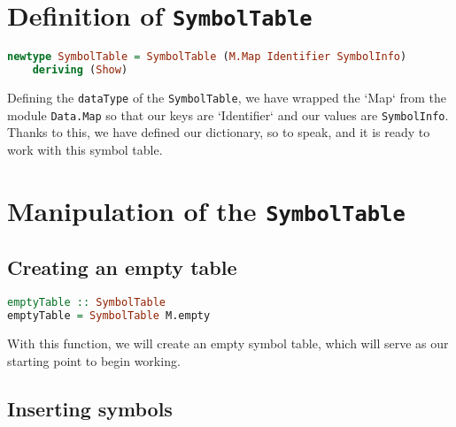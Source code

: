 \documentclass{article}
\newcommand{\code}[1]{\colorbox{codebackground}{\texttt{#1}}}
\begin{document}
\section{Definition of \code{SymbolTable}}

\begin{lstlisting}[language=Haskell]
newtype SymbolTable = SymbolTable (M.Map Identifier SymbolInfo)
    deriving (Show)
\end{lstlisting}

Defining the \code{dataType} of the \code{SymbolTable}, we have wrapped the `Map` from the module \code{Data.Map} so that our keys are `Identifier` and our values are \code{SymbolInfo}. Thanks to this, we have defined our dictionary, so to speak, and it is ready to work with this symbol table.

\section{Manipulation of the \code{SymbolTable}}

\subsection{Creating an empty table}

\begin{lstlisting}[language=Haskell]
emptyTable :: SymbolTable
emptyTable = SymbolTable M.empty
\end{lstlisting}

With this function, we will create an empty symbol table, which will serve as our starting point to begin working.

\subsection{Inserting symbols}
\end{document}
